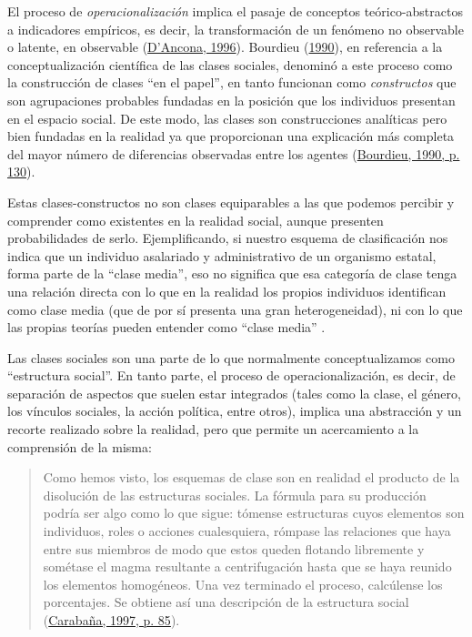 \documentclass[
]{article}
\begin{document}
El proceso de \emph{operacionalización} implica el pasaje de conceptos teórico-abstractos a indicadores empíricos, es decir, la transformación de un fenómeno no observable o latente, en observable (\protect\hyperlink{ref-DAncona1996}{D'Ancona, 1996}). Bourdieu (\protect\hyperlink{ref-Bourdieu1990}{1990}), en referencia a la conceptualización científica de las clases sociales, denominó a este proceso como la construcción de clases ``en el papel'', en tanto funcionan como \emph{constructos} que son agrupaciones probables fundadas en la posición que los individuos presentan en el espacio social. De este modo, las clases son construcciones analíticas pero bien fundadas en la realidad ya que proporcionan una explicación más completa del mayor número de diferencias observadas entre los agentes (\protect\hyperlink{ref-Bourdieu1990}{Bourdieu, 1990, p. 130}).

Estas clases-constructos no son clases equiparables a las que podemos percibir y comprender como existentes en la realidad social, aunque presenten probabilidades de serlo. Ejemplificando, si nuestro esquema de clasificación nos indica que un individuo asalariado y administrativo de un organismo estatal, forma parte de la ``clase media'', eso no significa que esa categoría de clase tenga una relación directa con lo que en la realidad los propios individuos identifican como clase media (que de por sí presenta una gran heterogeneidad), ni con lo que las propias teorías pueden entender como ``clase media'' .

Las clases sociales son una parte de lo que normalmente conceptualizamos como ``estructura social''. En tanto parte, el proceso de operacionalización, es decir, de separación de aspectos que suelen estar integrados (tales como la clase, el género, los vínculos sociales, la acción política, entre otros), implica una abstracción y un recorte realizado sobre la realidad, pero que permite un acercamiento a la comprensión de la misma:

\begin{quote}
Como hemos visto, los esquemas de clase son en realidad el producto de la disolución de las estructuras sociales. La fórmula para su producción podría ser algo como lo que sigue: tómense estructuras cuyos elementos son individuos, roles o acciones cualesquiera, rómpase las relaciones que haya entre sus miembros de modo que estos queden flotando libremente y sométase el magma resultante a centrifugación hasta que se haya reunido los elementos homogéneos. Una vez terminado el proceso, calcúlense los porcentajes. Se obtiene así una descripción de la estructura social (\protect\hyperlink{ref-Carabana1997}{Carabaña, 1997, p. 85}).
\end{quote}
\end{document}

